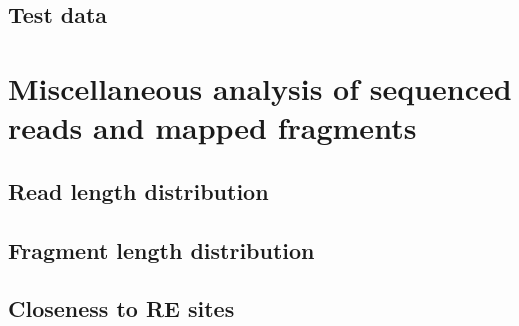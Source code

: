\documentclass[11pt]{article}
\begin{document}
\subsection{Test data}


\section{Miscellaneous analysis of sequenced reads and mapped fragments}

\subsection{Read length distribution}

\subsection{Fragment length distribution}

\subsection{Closeness to RE sites}




\end{document}
